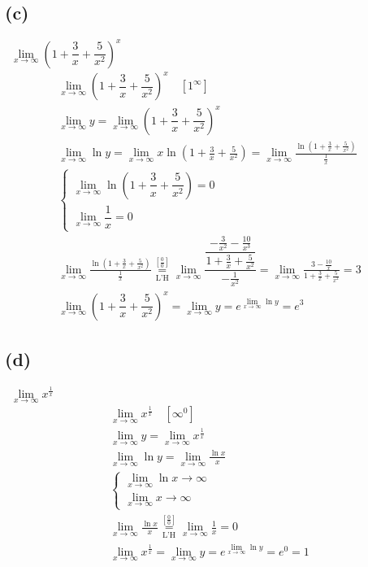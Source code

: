 \documentclass[12pt]{article}
\newcommand*{\lheqzero}{\ensuremath{\underset{\text{L'H}}{\overset{\left[\frac00\right]}{=}}}}
\newcommand{\subproblem}[1]{\subsection{(#1)} \,}
\begin{document}
\subproblem{c}
$\lim\limits_{x \to \infty}(1+\dfrac{3}{x}+\dfrac{5}{x^2})^x$
\begin{gather*}
    \lim\limits_{x \to \infty}(1+\dfrac{3}{x}+\dfrac{5}{x^2})^x \quad [1^\infty]\\
    \lim\limits_{x \to \infty}y=\lim\limits_{x \to \infty}(1+\dfrac{3}{x}+\dfrac{5}{x^2})^x\\
    \lim\limits_{x \to \infty} \ln y=\lim\limits_{x \to \infty} x \ln (1+\frac{3}{x}+\frac{5}{x^2})=\lim\limits_{x \to \infty} \frac{\ln (1+\frac{3}{x}+\frac{5}{x^2})}{\frac{1}{x}}\\
    \begin{cases}
        \lim\limits_{x \to \infty} \ln (1+\dfrac{3}{x}+\dfrac{5}{x^2}) =0\\
        \lim\limits_{x \to \infty}\dfrac{1}{x}=0
    \end{cases}\\
    \lim\limits_{x \to \infty} \frac{\ln (1+\frac{3}{x}+\frac{5}{x^2})}{\frac{1}{x}} \lheqzero \lim\limits_{x \to \infty}\dfrac{\dfrac{-\frac{3}{x^2}-\frac{10}{x^3}}{1+\frac{3}{x}+\frac{5}{x^2}}}{-\frac{1}{x^2}}=\lim\limits_{x \to \infty}\frac{3-\frac{10}{x}}{1+\frac{3}{x}+\frac{5}{x^2}}=3\\
    \lim\limits_{x \to \infty}(1+\dfrac{3}{x}+\dfrac{5}{x^2})^x=\lim\limits_{x \to \infty} y =e^{\lim\limits_{x \to \infty} \ln y}=\boxed{e^3}
\end{gather*}

\subproblem{d}
$\lim\limits_{x \to \infty} x^\frac{1}{x}$
\begin{gather*}
    \lim\limits_{x \to \infty} x^\frac{1}{x} \quad [\infty^0]\\
    \lim\limits_{x \to \infty}y=\lim\limits_{x \to \infty} x^\frac{1}{x}\\
    \lim\limits_{x \to \infty} \ln y =\lim\limits_{x \to \infty} \frac{\ln x}{x}\\
    \begin{cases}
        \lim\limits_{x \to \infty} \ln x \to \infty\\
        \lim\limits_{x \to \infty} x \to \infty
    \end{cases}\\
    \lim\limits_{x \to \infty} \frac{\ln x}{x}\lheqzero \lim\limits_{x \to \infty} \frac{1}{x} = 0\\
    \lim\limits_{x \to \infty} x^\frac{1}{x}=\lim\limits_{x \to \infty}y = e^{\lim\limits_{x \to \infty} \ln y} =e^0 =\boxed{1}
\end{gather*}
\end{document}
